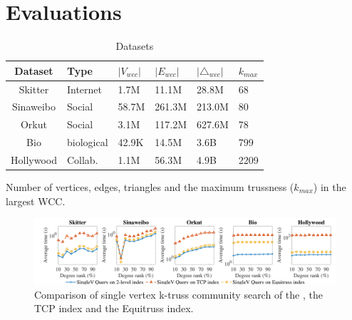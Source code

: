 \section{Evaluations}
\label{evaluation}
\begin{table}
\caption{Datasets}
\label{table:datasets} 
\begin{threeparttable}
	\centering
		\begin{tabularx}{\linewidth}{c|*{5}{Y}} 
		\toprule
			Dataset & Type & $|V_{wcc}|$ & $|E_{wcc}|$ & $|{\triangle}_{wcc}|$ & $k_{max}$ \\
			\midrule
			Skitter & Internet & 1.7M & 11.1M & 28.8M & 68 \\ 
			Sinaweibo & Social & 58.7M & 261.3M & 213.0M & 80 \\ 
			Orkut & Social & 3.1M & 117.2M & 627.6M & 78 \\
			Bio & biological & 42.9K & 14.5M & 3.6B & 799 \\
			Hollywood & Collab. & 1.1M & 56.3M & 4.9B & 2209 \\
			\bottomrule
			\end{tabularx}
			\begin{tablenotes}
				\item Number of vertices, edges, triangles and the maximum trussness ($k_{max}$) in the largest WCC. 
			\end{tablenotes}
		\end{threeparttable}
		\vspace{-0.5cm}
\end{table}

\begin{figure}[h]
    \centering
    \includegraphics[width=0.9\linewidth, trim={0cm 0cm, 0cm, 0.3cm}, clip]{./figures/singlev_k_compare_small.pdf}
    \caption{Comparison of single vertex k-truss community search of the \twolevelindex{}, the TCP index and the Equitruss index.}
    \label{fig:singlev_k_compare}
		\vspace{-0.3cm}
\end{figure}


